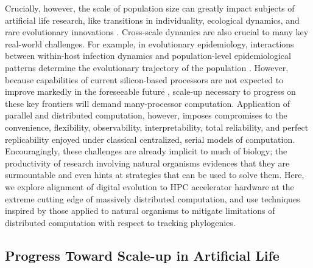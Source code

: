 Crucially, however, the scale of population size can greatly impact subjects of artificial life research, like transitions in individuality, ecological dynamics, and rare evolutionary innovations \citep{taylor2016open,dolson2021digital,taylor2019evolutionary}.
Cross-scale dynamics are also crucial to many key real-world challenges.
For example, in evolutionary epidemiology, interactions between within-host infection dynamics and population-level epidemiological patterns determine the evolutionary trajectory of the population \citep{schreiber2021cross}.
However, because capabilities of current silicon-based processors are not expected to improve markedly in the foreseeable future \citep{sutter2005free}, scale-up necessary to progress on these key frontiers will demand many-processor computation.
Application of parallel and distributed computation, however, imposes compromises to the convenience, flexibility, observability, interpretability, total reliability, and perfect replicability enjoyed under classical centralized, serial models of computation.
Encouragingly, these challenges are already implicit to much of biology; the productivity of research involving natural organisms evidences that they are surmountable and even hints at strategies that can be used to solve them.
Here, we explore alignment of digital evolution to HPC accelerator hardware at the extreme cutting edge of massively distributed computation, and use techniques inspired by those applied to natural organisms to mitigate limitations of distributed computation with respect to tracking phylogenies.

\subsection{Progress Toward Scale-up in Artificial Life}


